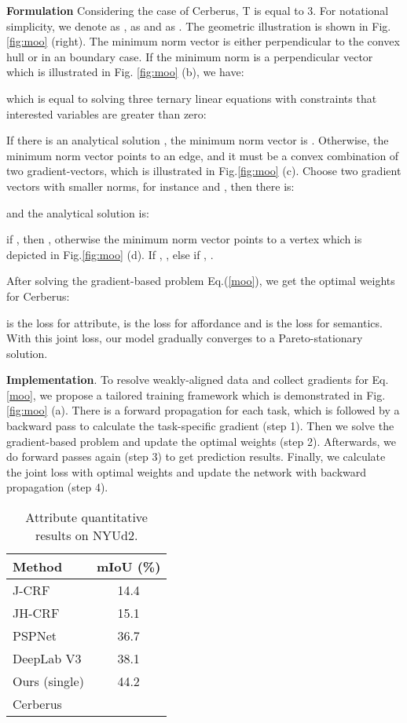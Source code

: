 \documentclass[10pt,twocolumn,letterpaper]{article}
\begin{document}
\textbf{Formulation} Considering the case of Cerberus, T is equal to 3. For notational simplicity, we denote  as ,  as  and  as . The geometric illustration is shown in Fig. \ref{fig:moo} (right). The  minimum norm vector  is either perpendicular to the convex hull or in an boundary case. If the minimum norm is a perpendicular vector which is illustrated in Fig. \ref{fig:moo} (b), we have:

which is equal to solving three ternary linear equations with constraints that interested variables are greater than zero:

If there is an analytical solution , the minimum norm vector is . Otherwise, the minimum norm vector points to an edge, and it must be a convex combination of two gradient-vectors, which is illustrated in Fig.\ref{fig:moo} (c). Choose two gradient vectors with smaller norms, for instance  and , then there is:

and the analytical solution is:

if , then , otherwise the minimum norm vector points to a vertex which is depicted in Fig.\ref{fig:moo} (d). If , , else if , .

After solving the gradient-based problem Eq.(\ref{moo}), we get the optimal weights   for Cerberus:

  is the loss for attribute,  is the loss for affordance and  is the loss for semantics. With this joint loss, our model gradually converges to a Pareto-stationary solution. 

\textbf{Implementation}. To resolve weakly-aligned data and collect gradients for Eq.\ref{moo}, we propose a tailored training framework which  is demonstrated in Fig.\ref{fig:moo} (a). There is a forward propagation for each task, which is followed by a backward pass to calculate the task-specific gradient (step 1). Then we solve the gradient-based problem and update the optimal weights (step 2). Afterwards, we do forward passes again (step 3) to get prediction results. Finally, we calculate the joint loss with optimal weights and update the network with backward propagation (step 4). 

\begin{table}
	\centering
	\begin{tabular}{@{}lc@{}}
		\toprule
		\textbf{Method} & \textbf{mIoU (\%)} \\
		\midrule
		J-CRF \cite{zheng2014dense} & 14.4 \\
		JH-CRF \cite{zheng2014dense} & 15.1 \\
		PSPNet \cite{zhao2017pyramid} & 36.7  \\
		DeepLab V3 \cite{chen2017rethinking} &  38.1 \\
		\midrule
		Ours (single) & {44.2} \\
		Cerberus &  \\
		\bottomrule
	\end{tabular}
	\caption{Attribute quantitative results on NYUd2.}
	\label{tab:attribute}
\end{table}
\end{document}
